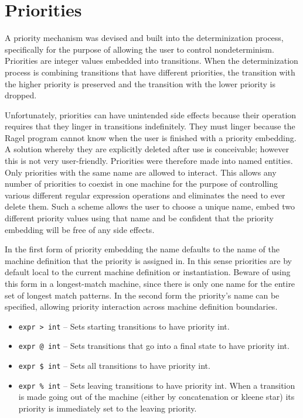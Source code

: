 \documentclass[letterpaper,11pt,oneside]{book}
\begin{document}
\section{Priorities}

A priority mechanism was devised and built into the determinization
process, specifically for the purpose of allowing the user to control
nondeterminism.  Priorities are integer values embedded into transitions. When
the determinization process is combining transitions that have different
priorities, the transition with the higher priority is preserved and the
transition with the lower priority is dropped.

Unfortunately, priorities can have unintended side effects because their
operation requires that they linger in transitions indefinitely. They must linger
because the Ragel program cannot know when the user is finished with a priority
embedding.  A solution whereby they are explicitly deleted after use is
conceivable; however this is not very user-friendly.  Priorities were therefore
made into named entities. Only priorities with the same name are allowed to
interact.  This allows any number of priorities to coexist in one machine for
the purpose of controlling various different regular expression operations and
eliminates the need to ever delete them. Such a scheme allows the user to
choose a unique name, embed two different priority values using that name
and be confident that the priority embedding will be free of any side effects.

In the first form of priority embedding the name defaults to the name of the machine
definition that the priority is assigned in. In this sense priorities are by
default local to the current machine definition or instantiation. Beware of
using this form in a longest-match machine, since there is only one name for
the entire set of longest match patterns. In the second form the priority's
name can be specified, allowing priority interaction across machine definition
boundaries.

\begin{itemize}
\setlength{\parskip}{0in}
\item \verb|expr > int| -- Sets starting transitions to have priority int.
\item \verb|expr @ int| -- Sets transitions that go into a final state to have priority int. 
\item \verb|expr $ int| -- Sets all transitions to have priority int.
\item \verb|expr % int| -- Sets leaving transitions to
have priority int. When a transition is made going out of the machine (either
by concatenation or kleene star) its priority is immediately set to the 
leaving priority.  
\end{itemize}
\end{document}

